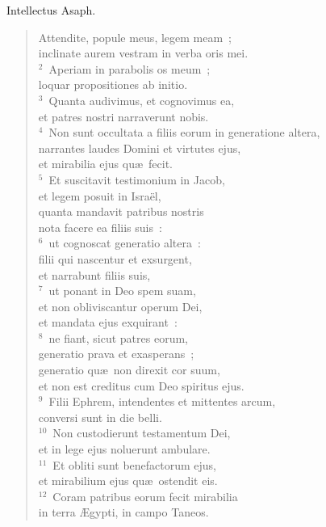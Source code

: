 \bchapter
\lettrine[lines=3,image=true,loversize=0.05,lraise=-0.03]{I}{}ntellectus Asaph. \begin{flushleft}\begin{verse}\vspace{6pt}Attendite, popule meus, legem meam~;\\ inclinate aurem vestram in verba oris mei.\\
${}^{2}$~Aperiam in parabolis os meum~;\\ loquar propositiones ab initio.\\
${}^{3}$~Quanta audivimus, et cognovimus ea,\\ et patres nostri narraverunt nobis.\\
${}^{4}$~Non sunt occultata a filiis eorum in generatione altera,\\ narrantes laudes Domini et virtutes ejus,\\ et mirabilia ejus qu\ae\ fecit.\\
${}^{5}$~Et suscitavit testimonium in Jacob,\\ et legem posuit in Isra\"el,\\ quanta mandavit patribus nostris\\ nota facere ea filiis suis~:\\
${}^{6}$~ut cognoscat generatio altera~:\\ filii qui nascentur et exsurgent,\\ et narrabunt filiis suis,\\
${}^{7}$~ut ponant in Deo spem suam,\\ et non obliviscantur operum Dei,\\ et mandata ejus exquirant~:\\
${}^{8}$~ne fiant, sicut patres eorum,\\ generatio prava et exasperans~;\\ generatio qu\ae\ non direxit cor suum,\\ et non est creditus cum Deo spiritus ejus.\\
${}^{9}$~Filii Ephrem, intendentes et mittentes arcum,\\ conversi sunt in die belli.\\
${}^{10}$~Non custodierunt testamentum Dei,\\ et in lege ejus noluerunt ambulare.\\
${}^{11}$~Et obliti sunt benefactorum ejus,\\ et mirabilium ejus qu\ae\ ostendit eis.\\
${}^{12}$~Coram patribus eorum fecit mirabilia\\ in terra \AE gypti, in campo Taneos.\\

\end{verse}
\end{flushleft}
